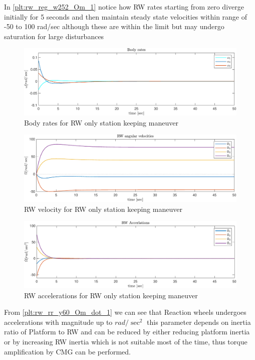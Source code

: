 \noindent In \autoref{plt:rw_reg_w252_Om_1} notice how RW rates starting from zero diverge initially for 5 seconds and then maintain steady state velocities within range of -50 to 100 rad/sec although these are within the limit but may undergo saturation for large disturbances

\begin{figure}[H]
    \centering
    \includegraphics[width=0.9\columnwidth]{figures/plots/RW/rw_reg_w252_w.pdf}
    \caption{Body rates for RW only station keeping maneuver}
    \label{plt:rw_reg_w252_w_1}
\end{figure}


\begin{figure}[H]
    \centering
    \includegraphics[width=0.9\columnwidth]{figures/plots/RW/rw_reg_w252_Om.pdf}
    \caption{RW velocity for RW only station keeping maneuver}
    \label{plt:rw_reg_w252_Om_1}
\end{figure}

\begin{figure}[H]
    \centering
    \includegraphics[width=0.9\columnwidth]{figures/plots/RW/rw_reg_w252_Om_dot.pdf}
    \caption{RW accelerations for RW only station keeping maneuver}
    \label{plt:rw_rw_reg_w252_Om_dot_1}
\end{figure}
\noindent From \autoref{plt:rw_rr_y60_Om_dot_1} we can see that Reaction wheels undergoes accelerations with magnitude up to $rad /\sec^2$ this parameter depends on inertia ratio of Platform to RW and can be reduced by either reducing platform inertia or by increasing RW inertia which is not suitable most of the time, thus torque amplification by CMG can be performed.
